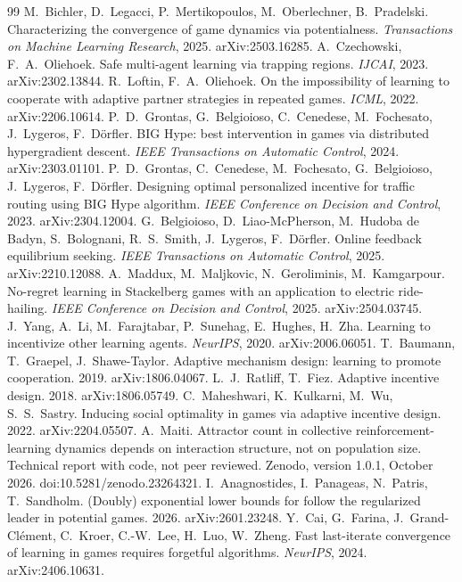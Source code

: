 \documentclass[11pt,a4paper]{article}
\theoremstyle{definition}
\theoremstyle{plain}
\begin{document}
\begin{thebibliography}{99}
 M.~Bichler, D.~Legacci, P.~Mertikopoulos, M.~Oberlechner, B.~Pradelski. Characterizing the convergence of game dynamics via potentialness. \emph{Transactions on Machine Learning Research}, 2025. arXiv:2503.16285.
 A.~Czechowski, F.~A.~Oliehoek. Safe multi-agent learning via trapping regions. \emph{IJCAI}, 2023. arXiv:2302.13844.
 R.~Loftin, F.~A.~Oliehoek. On the impossibility of learning to cooperate with adaptive partner strategies in repeated games. \emph{ICML}, 2022. arXiv:2206.10614.
 P.~D.~Grontas, G.~Belgioioso, C.~Cenedese, M.~Fochesato, J.~Lygeros, F.~D\"orfler. BIG Hype: best intervention in games via distributed hypergradient descent. \emph{IEEE Transactions on Automatic Control}, 2024. arXiv:2303.01101.
 P.~D.~Grontas, C.~Cenedese, M.~Fochesato, G.~Belgioioso, J.~Lygeros, F.~D\"orfler. Designing optimal personalized incentive for traffic routing using BIG Hype algorithm. \emph{IEEE Conference on Decision and Control}, 2023. arXiv:2304.12004.
 G.~Belgioioso, D.~Liao-McPherson, M.~Hudoba de Badyn, S.~Bolognani, R.~S.~Smith, J.~Lygeros, F.~D\"orfler. Online feedback equilibrium seeking. \emph{IEEE Transactions on Automatic Control}, 2025. arXiv:2210.12088.
 A.~Maddux, M.~Maljkovic, N.~Geroliminis, M.~Kamgarpour. No-regret learning in Stackelberg games with an application to electric ride-hailing. \emph{IEEE Conference on Decision and Control}, 2025. arXiv:2504.03745.
 J.~Yang, A.~Li, M.~Farajtabar, P.~Sunehag, E.~Hughes, H.~Zha. Learning to incentivize other learning agents. \emph{NeurIPS}, 2020. arXiv:2006.06051.
 T.~Baumann, T.~Graepel, J.~Shawe-Taylor. Adaptive mechanism design: learning to promote cooperation. 2019. arXiv:1806.04067.
 L.~J.~Ratliff, T.~Fiez. Adaptive incentive design. 2018. arXiv:1806.05749.
 C.~Maheshwari, K.~Kulkarni, M.~Wu, S.~S.~Sastry. Inducing social optimality in games via adaptive incentive design. 2022. arXiv:2204.05507.
 A.~Maiti. Attractor count in collective reinforcement-learning dynamics depends on interaction structure, not on population size. Technical report with code, not peer reviewed. Zenodo, version 1.0.1, October 2026. doi:10.5281/zenodo.23264321.
 I.~Anagnostides, I.~Panageas, N.~Patris, T.~Sandholm. (Doubly) exponential lower bounds for follow the regularized leader in potential games. 2026. arXiv:2601.23248.
 Y.~Cai, G.~Farina, J.~Grand-Cl\'ement, C.~Kroer, C.-W.~Lee, H.~Luo, W.~Zheng. Fast last-iterate convergence of learning in games requires forgetful algorithms. \emph{NeurIPS}, 2024. arXiv:2406.10631.

\end{thebibliography}
\end{document}
